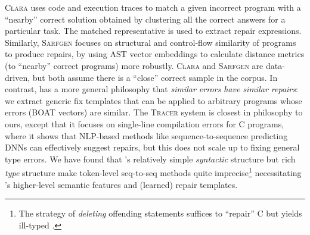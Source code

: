 %
\textsc{Clara} \citep{Gulwani_2018} uses code and execution traces to match a
given incorrect program with a ``nearby'' correct solution obtained by
clustering all the correct answers for a particular task. The matched
representative is used to extract repair expressions.
%
Similarly, \textsc{Sarfgen} \citep{Wang_2018} focuses on structural and
control-flow similarity of programs to produce repairs, by using AST vector
embeddings to calculate distance metrics (to ``nearby'' correct
programs) more robustly.
%
\textsc{Clara} and \textsc{Sarfgen} are data-driven, but both assume
there is a ``close'' correct sample in the corpus.
%
In contrast, \toolname has a more general philosophy that \emph{similar errors
have similar repairs}: we extract generic fix templates that can be applied to
arbitrary programs whose errors (BOAT vectors) are similar.
%
The \textsc{Tracer} system \cite{TRACER2018} is closest in philosophy to ours,
except that it focuses on single-line compilation errors for C programs, where
it shows that NLP-based methods like sequence-to-sequence predicting DNNs can
effectively suggest repairs, %
but this does not scale up to fixing general type errors.
%
We have found that \ocaml's relatively simple
\emph{syntactic} structure but rich \emph{type}
structure make token-level seq-to-seq methods quite imprecise\footnote{The
strategy of \emph{deleting} offending statements suffices to ``repair'' C but
yields ill-typed \ocaml.} necessitating \toolname's higher-level semantic
features and (learned) repair templates.


%
%

